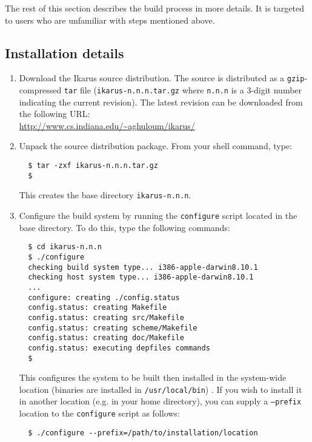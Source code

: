 \documentclass[onecolumn, 12pt, twoside, openright, dvipdfm]{book}
\begin{document}
The rest of this section describes the build process in more
details.  It is targeted to users who are unfamiliar with steps
mentioned above.

\subsection{Installation details}

\begin{enumerate}

\item Download the Ikarus source distribution.  The source is
distributed as a \texttt{gzip}-compressed \texttt{tar} file
(\texttt{ikarus-n.n.n.tar.gz} where \texttt{n.n.n} is a 3-digit
number indicating the current revision).  The latest revision can be
downloaded from the following URL:\\
\url{http://www.cs.indiana.edu/~aghuloum/ikarus/}

\item Unpack the source distribution package.  From your shell
command, type:
\begin{verbatim}
  $ tar -zxf ikarus-n.n.n.tar.gz
  $
\end{verbatim}
This creates the base directory \texttt{ikarus-n.n.n}.

\item Configure the build system by running the \texttt{configure}
script located in the base directory.  To do this, type the
following commands:
\begin{verbatim}
  $ cd ikarus-n.n.n
  $ ./configure
  checking build system type... i386-apple-darwin8.10.1
  checking host system type... i386-apple-darwin8.10.1
  ...
  configure: creating ./config.status
  config.status: creating Makefile
  config.status: creating src/Makefile
  config.status: creating scheme/Makefile
  config.status: creating doc/Makefile
  config.status: executing depfiles commands
  $
\end{verbatim}

This configures the system to be built then installed in the
system-wide location (binaries are installed in
\texttt{/usr/local/bin}) .  If you wish to install it
in another location (e.g. in your home directory), you can supply
a \texttt{--prefix} location to the \texttt{configure} script as
follows:

\begin{verbatim}
  $ ./configure --prefix=/path/to/installation/location
\end{verbatim}


\end{enumerate}
\end{document}
